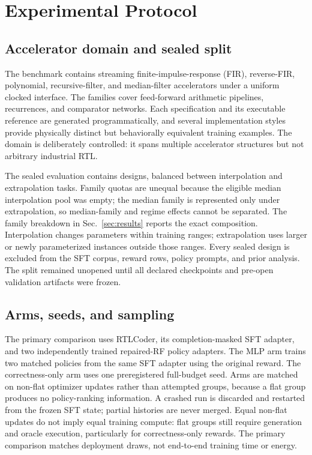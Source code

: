 \section{Experimental Protocol}
\label{sec:setup}

\subsection{Accelerator domain and sealed split}

The benchmark contains streaming finite-impulse-response (FIR), reverse-FIR,
polynomial, recursive-filter, and median-filter accelerators under a uniform
clocked interface.  The families cover feed-forward arithmetic pipelines,
recurrences, and comparator networks.  Each specification and its executable
reference are generated programmatically, and several implementation styles
provide physically distinct but behaviorally equivalent training examples.
The domain is deliberately controlled: it spans multiple accelerator
structures but not arbitrary industrial RTL.

The sealed evaluation contains  designs,
balanced between  interpolation and
 extrapolation tasks.  Family quotas are
unequal because the eligible median interpolation pool was empty; the median
family is represented only under extrapolation, so median-family and regime
effects cannot be separated.  The family breakdown in
Sec.~\ref{sec:results} reports the exact composition.  Interpolation changes parameters within
training ranges; extrapolation uses larger or newly parameterized instances
outside those ranges.  Every sealed design is excluded from the SFT corpus,
reward rows, policy prompts, and prior analysis.  The split remained unopened
until all declared checkpoints and pre-open validation artifacts were frozen.

\subsection{Arms, seeds, and sampling}

The primary comparison uses RTLCoder, its completion-masked SFT adapter, and
two independently trained repaired-RF policy adapters.  The MLP arm trains two
matched policies from the same SFT adapter using the original reward.  The
correctness-only arm uses one preregistered full-budget seed.  Arms are matched
on non-flat optimizer updates rather than attempted groups, because a flat
group produces no policy-ranking information.  A crashed run is discarded and
restarted from the frozen SFT state; partial histories are never merged.
Equal non-flat updates do not imply equal training compute: flat groups still
require generation and oracle execution, particularly for correctness-only
rewards.  The primary comparison matches deployment draws, not end-to-end
training time or energy.

